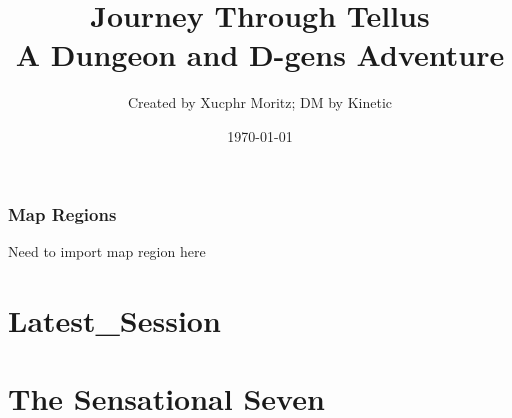 \documentclass[letterpaper,twocolumn,openany,nodeprecatedcode]{dndbook}
\title{Journey Through Tellus \\
\large A Dungeon and D-gens Adventure}
\author{Created by Xucphr Moritz; DM by Kinetic}
\date{\today}
\begin{document}
\frontmatter

\maketitle

\tableofcontents

\mainmatter%



\section{Map Regions}

Need to import map region here




\part*{Latest_Session}


%

\part{The Sensational Seven}



%


%
\end{document}
